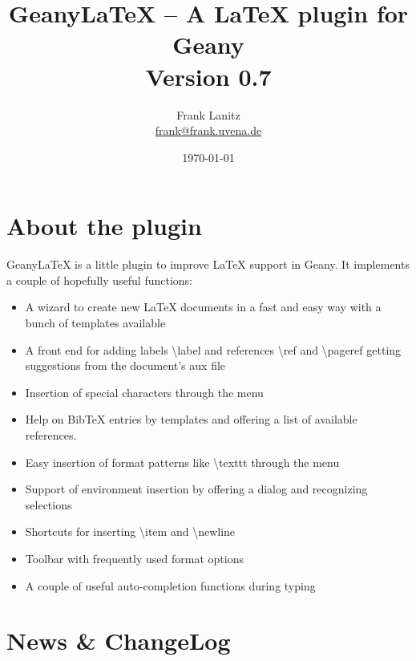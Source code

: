 \documentclass[%
paper=a4,%
fontsize=11pt,%
twoside=false,%
DIV18,%
headsepline,%
plainheadsepline,%
footsepline,%
plainfootsepline,%
bibliography=totoc,%
listof=totoc,%
BCOR10mm,%
parskip=half,%
openany,%
]{scrartcl}
\title{Geany\LaTeX{} -- A \LaTeX{} plugin for Geany \\[1.5ex]
	   \normalsize Version 0.7}
\author{Frank Lanitz \\ \small{\href{mailto:frank@frank.uvena.de}{frank@frank.uvena.de}}}
\date{\today}
\begin{document}
\dedication{\normalsize \textbf{Note:} Please note that this document has been created on
\today. If you are using a devel version from GIT, please compile and check
\texttt{doc/geanylatex.tex} from sources. Please check Page \pageref
{sec:compiling_of_documentation}, Section \ref{sec:compiling_of_documentation} on how to do this. }


\maketitle{}
\tableofcontents{}
\listoftables{}
\listoffigures{}
\lstlistoflistings{}

\newpage{}
\section{About the plugin}

Geany\LaTeX{} is a little plugin to improve \LaTeX{} support in Geany.
It implements a couple of hopefully useful functions:

\begin{itemize}
	\item A wizard to create new \LaTeX{} documents in a fast and easy way
	 	  with a bunch of templates available
	\item A front end for adding labels \textbackslash label{} and
		  references \textbackslash ref{} and \textbackslash pageref{}
   		  getting suggestions from the document's aux file
	\item Insertion of special characters through the menu
	\item Help on BibTeX entries by templates and offering a list of
		  available references.
	\item Easy insertion of format patterns like \textbackslash texttt{}
		  through the menu
	\item Support of environment insertion by offering a dialog and
		  recognizing selections
	\item Shortcuts for inserting \textbackslash item and
		  \textbackslash newline
	\item Toolbar with frequently used format options
	\item A couple of useful auto-completion functions during typing
\end{itemize}

\newpage
\section{News \& ChangeLog}
\end{document}
